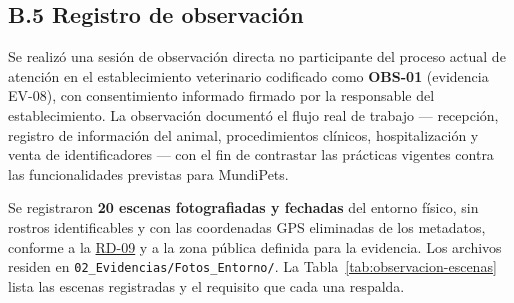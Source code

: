 \documentclass[journal,onecolumn]{IEEEtran}
\begin{document}
	
	\subsection*{B.5 Registro de observación}
	
	Se realizó una sesión de observación directa no participante del proceso
	actual de atención en el establecimiento veterinario codificado como
	\textbf{OBS-01} (evidencia EV-08), con consentimiento informado firmado por
	la responsable del establecimiento. La observación documentó el flujo real de
	trabajo --- recepción, registro de información del animal, procedimientos
	clínicos, hospitalización y venta de identificadores --- con el fin de
	contrastar las prácticas vigentes contra las funcionalidades previstas para
	MundiPets.
	
	Se registraron \textbf{20 escenas fotografiadas y fechadas} del entorno
	físico, sin rostros identificables y con las coordenadas GPS eliminadas de
	los metadatos, conforme a la \hyperref[tab:RD-09]{RD-09} y a la zona pública definida para la
	evidencia. Los archivos residen en
	\texttt{02\_Evidencias/Fotos\_Entorno/}. La
	Tabla~\ref{tab:observacion-escenas} lista las escenas registradas y el
	requisito que cada una respalda.
	
\end{document}
